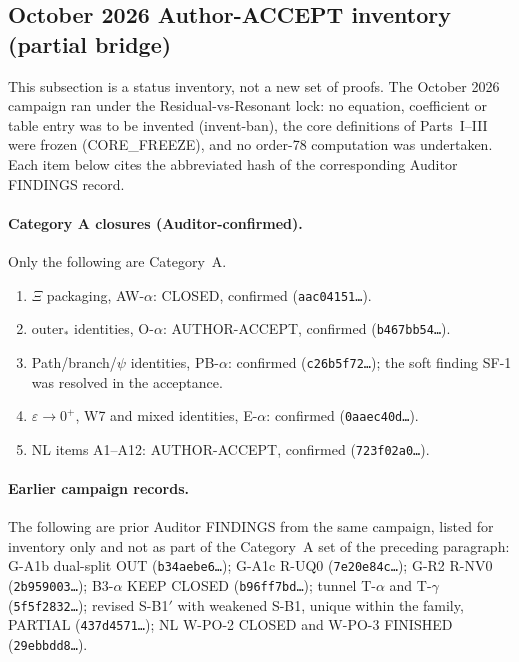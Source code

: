 \subsection{October 2026 Author-ACCEPT inventory (partial bridge)}\label{sec:partial13}
This subsection is a status inventory, not a new set of proofs. The October 2026 campaign ran under the Residual-vs-Resonant lock: no equation, coefficient or table entry was to be invented (invent-ban), the core definitions of Parts~I--III were frozen (CORE\_FREEZE), and no order-78 computation was undertaken. Each item below cites the abbreviated hash of the corresponding Auditor FINDINGS record.

\paragraph{Category A closures (Auditor-confirmed).} Only the following are Category~A.
\begin{enumerate}
\item $\Xi$ packaging, AW-$\alpha$: CLOSED, confirmed (\texttt{aac04151\ldots}).
\item $\mathrm{outer}_*$ identities, O-$\alpha$: AUTHOR-ACCEPT, confirmed (\texttt{b467bb54\ldots}).
\item Path/branch/$\psi$ identities, PB-$\alpha$: confirmed (\texttt{c26b5f72\ldots}); the soft finding SF-1 was resolved in the acceptance.
\item $\varepsilon\to0^+$, W7 and mixed identities, E-$\alpha$: confirmed (\texttt{0aaec40d\ldots}).
\item NL items A1--A12: AUTHOR-ACCEPT, confirmed (\texttt{723f02a0\ldots}).
\end{enumerate}

\paragraph{Earlier campaign records.} The following are prior Auditor FINDINGS from the same campaign, listed for inventory only and not as part of the Category~A set of the preceding paragraph: G-A1b dual-split OUT (\texttt{b34aebe6\ldots}); G-A1c R-UQ0 (\texttt{7e20e84c\ldots}); G-R2 R-NV0 (\texttt{2b959003\ldots}); B3-$\alpha$ KEEP CLOSED (\texttt{b96ff7bd\ldots}); tunnel T-$\alpha$ and T-$\gamma$ (\texttt{5f5f2832\ldots}); revised S-B1$'$ with weakened S-B1, unique within the family, PARTIAL (\texttt{437d4571\ldots}); NL W-PO-2 CLOSED and W-PO-3 FINISHED (\texttt{29ebbdd8\ldots}).

